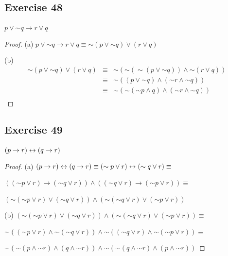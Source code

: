 \documentclass[14pt]{extarticle}
\begin{document}
\subsection{Exercise 48} $p \vee {\sim q} \to r \vee q$
\begin{proof} (a) $p \vee {\sim q} \to r \vee q \equiv {\sim (p \vee {\sim q})}
\vee (r \vee q)$

(b) $$ \begin{array}{rcl} {\sim (p \vee {\sim q})} \vee (r \vee q) & \equiv &
{\sim ({\sim ({\sim (p \vee {\sim q})})} \wedge {\sim (r \vee q)})} \\ & \equiv
& {\sim((p \vee {\sim q}) \wedge ({\sim r} \wedge {\sim q}))} \\ & \equiv &
{\sim({\sim ({\sim p} \wedge q)} \wedge ({\sim r} \wedge {\sim q}))} \\
\end{array} $$ \end{proof}

\subsection{Exercise 49} $(p \to r) \leftrightarrow (q \to r)$
\begin{proof} (a) $(p \to r) \leftrightarrow (q \to r) \equiv ({\sim p} \vee r) \leftrightarrow ({\sim
q} \vee r) \equiv$

$(({\sim p} \vee r) \to ({\sim q} \vee r)) \wedge (({\sim q} \vee r) \to ({\sim
p} \vee r)) \equiv$

$({\sim ({\sim p} \vee r)} \vee ({\sim q} \vee r)) \wedge ({\sim ({\sim q} \vee
r)} \vee ({\sim p} \vee r))$

(b) $({\sim ({\sim p} \vee r)} \vee ({\sim q} \vee r)) \wedge ({\sim ({\sim q}
\vee r)} \vee ({\sim p} \vee r)) \equiv$

${\sim (({\sim p} \vee r) \wedge {\sim ({\sim q} \vee r)})} \wedge {\sim (({\sim
q} \vee r) \wedge {\sim ({\sim p} \vee r)})} \equiv$

${\sim ({\sim (p \wedge {\sim r})} \wedge (q \wedge {\sim r}))} \wedge {\sim
({\sim (q \wedge {\sim r})} \wedge (p \wedge {\sim r}))}$ \end{proof}
\end{document}
